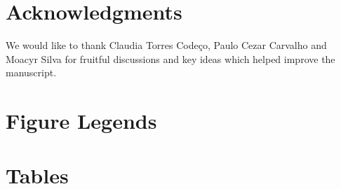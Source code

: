 \documentclass[10pt]{article}
\begin{document}


\section*{Acknowledgments}
We would like to thank Claudia Torres Code\c{c}o, Paulo Cezar Carvalho and Moacyr Silva for fruitful discussions and key ideas which helped improve the manuscript.



\section*{Figure Legends}


\section*{Tables}
\end{document}
